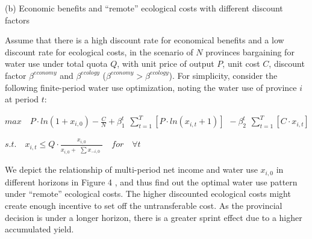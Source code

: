 \begin{case_appendix}

(b) Economic benefits and ``remote'' ecological costs with different discount factors

Assume that there is a high discount rate for economical benefits and a low discount rate for ecological costs, in the scenario of $N$ provinces bargaining for water use under total quota $Q$, with unit price of output $P$, unit cost $C$, discount factor $\beta^{economy}$ and $\beta^{ecology}$ ($\beta^{economy} > \beta^{ecology}$). For simplicity, consider the following finite-period water use optimization, noting the water use of province $i$ at period $t$:

$ max \quad P \cdot ln(1+x_{i,0})-\frac{C}{N}+\beta_1^t \begin{matrix} \sum_{t=1}^T [P \cdot ln(x_{i,t}+1)]  \end{matrix} - \beta_2^t \begin{matrix} \sum_{t=1}^T [C \cdot x_{i,t}] \end{matrix}$

$s.t. \quad x_{i,t} \leq Q \cdot \frac{x_{i,0}}{x_{i,0} + \begin{matrix} \sum x_{-i,0} \end{matrix}} \quad for \quad \forall t$

We depict the relationship of multi-period net income and water use $x_{i,0}$ in different horizons in Figure 4%
, and thus find out the optimal water use pattern under ``remote'' ecological costs. The higher discounted ecological costs might create enough incentive to set off the untransferable cost. As the provincial decision is under a longer horizon, there is a greater sprint effect due to a higher accumulated yield.




\end{case_appendix}
